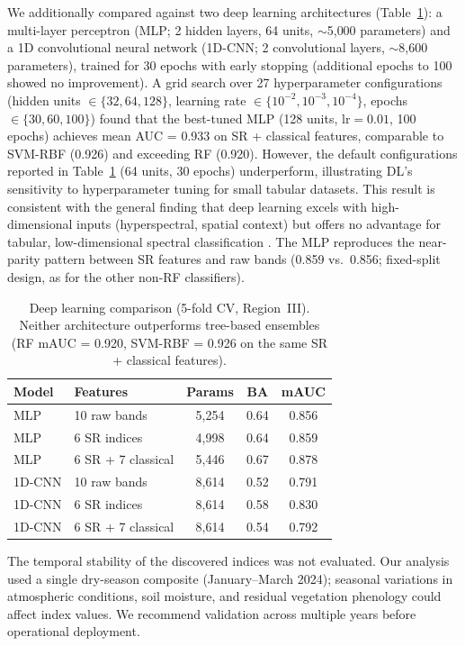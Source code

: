 \documentclass[preprint,authoryear,number]{elsarticle}
\begin{document}
We additionally compared against two deep learning architectures (Table~\ref{tab:dl}): a multi-layer perceptron (MLP; 2 hidden layers, 64 units, $\sim$5{,}000 parameters) and a 1D convolutional neural network (1D-CNN; 2 convolutional layers, $\sim$8{,}600 parameters), trained for 30 epochs with early stopping (additional epochs to 100 showed no improvement). A grid search over 27 hyperparameter configurations (hidden units $\in \{32, 64, 128\}$, learning rate $\in \{10^{-2}, 10^{-3}, 10^{-4}\}$, epochs $\in \{30, 60, 100\}$) found that the best-tuned MLP (128 units, $\text{lr}=0.01$, 100 epochs) achieves mean AUC = 0.933 on SR + classical features, comparable to SVM-RBF (0.926) and exceeding RF (0.920). However, the default configurations reported in Table~\ref{tab:dl} (64 units, 30 epochs) underperform, illustrating DL's sensitivity to hyperparameter tuning for small tabular datasets. This result is consistent with the general finding that deep learning excels with high-dimensional inputs (hyperspectral, spatial context) but offers no advantage for tabular, low-dimensional spectral classification \citep{Shirmard2022}. The MLP reproduces the near-parity pattern between SR features and raw bands (0.859 vs.\ 0.856; fixed-split design, as for the other non-RF classifiers).

\begin{table}[ht]
\centering
\caption{Deep learning comparison (5-fold CV, Region~III). Neither architecture outperforms tree-based ensembles (RF mAUC = 0.920, SVM-RBF = 0.926 on the same SR + classical features).}
\label{tab:dl}
\begin{tabular}{llccc}
\toprule
Model & Features & Params & BA & mAUC \\
\midrule
MLP & 10 raw bands & 5{,}254 & 0.64 & 0.856 \\
MLP & 6 SR indices & 4{,}998 & 0.64 & 0.859 \\
MLP & 6 SR + 7 classical & 5{,}446 & 0.67 & 0.878 \\
\midrule
1D-CNN & 10 raw bands & 8{,}614 & 0.52 & 0.791 \\
1D-CNN & 6 SR indices & 8{,}614 & 0.58 & 0.830 \\
1D-CNN & 6 SR + 7 classical & 8{,}614 & 0.54 & 0.792 \\
\bottomrule
\end{tabular}
\end{table}

The temporal stability of the discovered indices was not evaluated. Our analysis used a single dry-season composite (January--March 2024); seasonal variations in atmospheric conditions, soil moisture, and residual vegetation phenology could affect index values. We recommend validation across multiple years before operational deployment.
\end{document}
